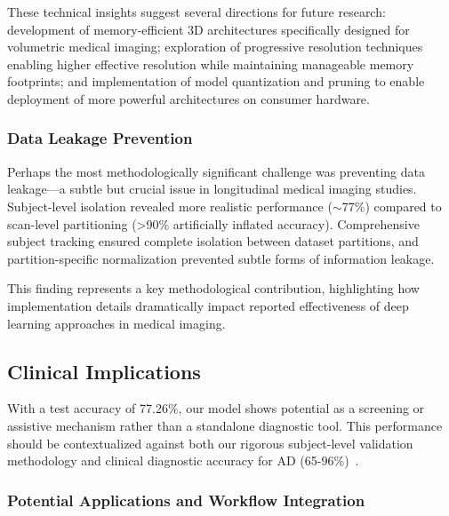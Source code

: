 \documentclass[12pt, a4paper]{article}
\begin{document}
These technical insights suggest several directions for future research: development of memory-efficient 3D architectures specifically designed for volumetric medical imaging; exploration of progressive resolution techniques enabling higher effective resolution while maintaining manageable memory footprints; and implementation of model quantization and pruning to enable deployment of more powerful architectures on consumer hardware.


\subsubsection{Data Leakage Prevention}

Perhaps the most methodologically significant challenge was preventing data leakage—a subtle but crucial issue in longitudinal medical imaging studies. Subject-level isolation revealed more realistic performance ($\sim$77\%) compared to scan-level partitioning (>90\% artificially inflated accuracy). Comprehensive subject tracking ensured complete isolation between dataset partitions, and partition-specific normalization prevented subtle forms of information leakage.

This finding represents a key methodological contribution, highlighting how implementation details dramatically impact reported effectiveness of deep learning approaches in medical imaging.

\subsection{Clinical Implications}

With a test accuracy of 77.26\%, our model shows potential as a screening or assistive mechanism rather than a standalone diagnostic tool. This performance should be contextualized against both our rigorous subject-level validation methodology and clinical diagnostic accuracy for AD (65-96\%)~\cite{kloppel2008accuracy}.

\subsubsection{Potential Applications and Workflow Integration}
\end{document}
